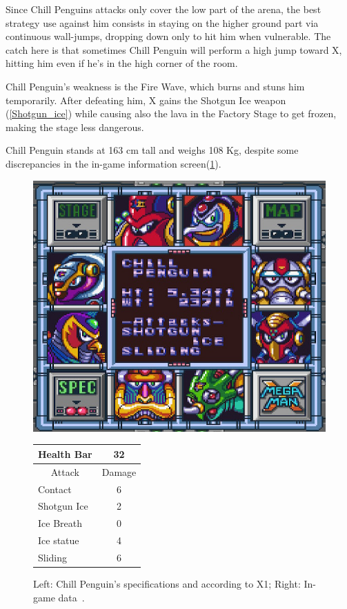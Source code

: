 Since Chill Penguins attacks only cover the low part of the arena,  the best strategy use against him consists in staying on the higher ground part via continuous wall-jumps, dropping down only to hit him when vulnerable. The catch here is that sometimes Chill Penguin will perform a high jump toward X, hitting him even if he's in the high corner of the room. 

Chill Penguin's weakness is the Fire Wave, which burns and stuns him temporarily. After defeating him, X gains the Shotgun Ice weapon (\ref{Shotgun_ice}) while causing also  the lava in the Factory Stage to get frozen, making the stage less dangerous.

Chill Penguin stands at 163 cm tall and weighs 108 Kg, despite some discrepancies in the in-game information screen(\ref{Penguin_specs}).

\begin{figure}[htp]
	\begin{minipage}[c]{0.45\linewidth}
		\vspace{0pt}
		\centering
		\includegraphics[width=\linewidth]{figures/X1/Chill_penguin/Chill_penguin_specs.jpg}
	\end{minipage}
	\begin{minipage}[c]{0.45\linewidth}
		\centering
		\vspace{0pt}
		\begin{tabular}[h]{l c}
			\toprule
			Health Bar & 32\\
			\midrule
			\multicolumn{1}{c}{Attack} & \multicolumn{1}{c}{Damage}\\
			Contact & 6\\
			Shotgun Ice & 2\\
			Ice Breath & 0\\
			Ice statue & 4\\
			Sliding & 6\\
			\bottomrule
		\end{tabular}
	\end{minipage}
	\caption{Left: Chill Penguin's specifications and according to X1; Right: In-game data~\cite{wiki:Chill_Penguin}. }
	\label{Penguin_specs}
\end{figure}



